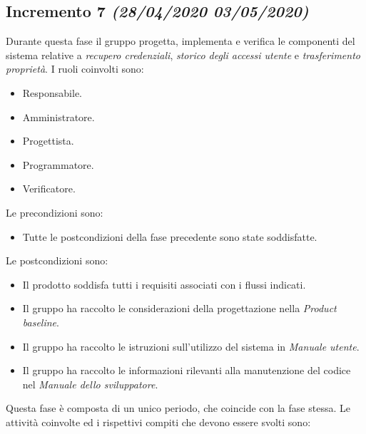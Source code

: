 \documentclass[../piano-di-progetto.tex]{subfiles}
\begin{document}
\subsection[Incremento 7]{Incremento 7 {\normalsize\normalfont\itshape(28/04/2020  03/05/2020)}}%
\label{sub:incremento_7}
Durante questa fase il gruppo progetta, implementa e verifica le componenti del sistema relative a \textit{recupero credenziali}, \textit{storico degli accessi utente} e \textit{trasferimento proprietà}.
I ruoli coinvolti sono:
\begin{itemize}
  \item Responsabile.
  \item Amministratore.
  \item Progettista.
  \item Programmatore.
  \item Verificatore.
\end{itemize}
Le precondizioni sono:
\begin{itemize}
  \item Tutte le postcondizioni della fase precedente sono state soddisfatte.
\end{itemize}
Le postcondizioni sono:
\begin{itemize}
  \item Il prodotto soddisfa tutti i requisiti associati con i flussi indicati.
  \item Il gruppo ha raccolto le considerazioni della progettazione nella \textit{Product baseline}.
  \item Il gruppo ha raccolto le istruzioni sull'utilizzo del sistema in \textit{Manuale utente}.
  \item Il gruppo ha raccolto le informazioni rilevanti alla manutenzione del codice nel \textit{Manuale dello sviluppatore}.
\end{itemize}
Questa fase è composta di un unico periodo, che coincide con la fase stessa.
Le attività coinvolte ed i rispettivi compiti che devono essere svolti sono:
\end{document}
